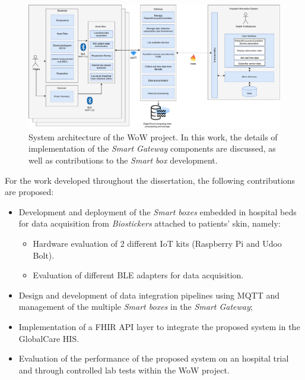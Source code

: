\clearpage
\begin{figure}[H]
    \centering
    \includegraphics[width=\linewidth]{images/architecture-color.drawio.pdf}
    \caption[System architecture of the \acs{WoW} project.]{System architecture of the \acs{WoW} project. In this work, the details of implementation of the \textit{Smart Gateway} components are discussed, as well as contributions to the \textit{Smart box} development.}
    \label{fig:wow-architecture}
\end{figure}

For the work developed throughout the dissertation, the following contributions are proposed:

\begin{itemize}
    \item Development and deployment of the \textit{Smart boxes} embedded in hospital beds for data acquisition from \textit{Biostickers} attached to patients’ skin, namely:
    \begin{itemize}
        \item Hardware evaluation of 2 different \acs{IoT} kits (Raspberry Pi and Udoo Bolt).
        \item Evaluation of different \acs{BLE} adapters for data acquisition.
    \end{itemize}
    \item Design and development of data integration pipelines using \acs{MQTT} and management of the multiple \textit{Smart boxes} in the \textit{Smart Gateway};
    \item Implementation of a \acs{FHIR} \acs{API} layer to integrate the proposed system in the GlobalCare \acs{HIS}.
    \item Evaluation of the performance of the proposed system on an hospital trial and through controlled lab tests within the \acs{WoW} project.
\end{itemize}

